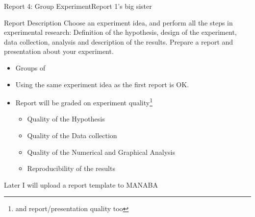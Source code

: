 \documentclass[t]{beamer}
\begin{document}
\begin{ftst}
  {Report 4: Group Experiment}{Report 1's big sister}

  \begin{block}{Report Description}
    Choose an experiment idea, and perform all the steps in
    experimental research: Definition of the hypothesis, design of the
    experiment, data collection, analysis and description of the
    results. Prepare a report and presentation about your experiment.
  \end{block}

  \begin{itemize}
  \item Groups of 
  \item Using the same experiment idea as the first report is OK.
  \item Report will be graded on \alert{experiment
    quality}\footnote{and report/presentation quality too}
    \begin{itemize}
    \item Quality of the Hypothesis
    \item Quality of the Data collection
    \item Quality of the Numerical and Graphical Analysis
    \item Reproducibility of the results
    \end{itemize}
  \end{itemize}

  Later I will upload a report template to MANABA

  \vspace{.5cm}
  
\end{ftst}
\end{document}
